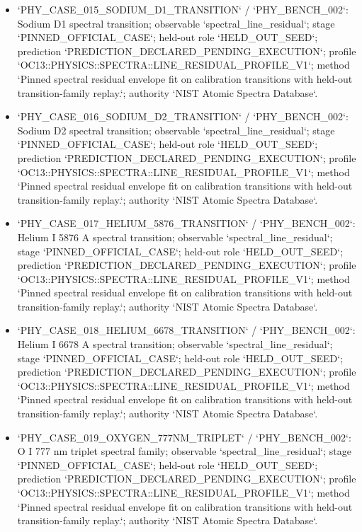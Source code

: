 \begin{itemize}
\item `PHY\_CASE\_015\_SODIUM\_D1\_TRANSITION` / `PHY\_BENCH\_002`: Sodium D1 spectral transition; observable `spectral\_line\_residual`; stage `PINNED\_OFFICIAL\_CASE`; held-out role `HELD\_OUT\_SEED`; prediction `PREDICTION\_DECLARED\_PENDING\_EXECUTION`; profile `OC13::PHYSICS::SPECTRA::LINE\_RESIDUAL\_PROFILE\_V1`; method `Pinned spectral residual envelope fit on calibration transitions with held-out transition-family replay.`; authority `NIST Atomic Spectra Database`.
\item `PHY\_CASE\_016\_SODIUM\_D2\_TRANSITION` / `PHY\_BENCH\_002`: Sodium D2 spectral transition; observable `spectral\_line\_residual`; stage `PINNED\_OFFICIAL\_CASE`; held-out role `HELD\_OUT\_SEED`; prediction `PREDICTION\_DECLARED\_PENDING\_EXECUTION`; profile `OC13::PHYSICS::SPECTRA::LINE\_RESIDUAL\_PROFILE\_V1`; method `Pinned spectral residual envelope fit on calibration transitions with held-out transition-family replay.`; authority `NIST Atomic Spectra Database`.
\item `PHY\_CASE\_017\_HELIUM\_5876\_TRANSITION` / `PHY\_BENCH\_002`: Helium I 5876 A spectral transition; observable `spectral\_line\_residual`; stage `PINNED\_OFFICIAL\_CASE`; held-out role `HELD\_OUT\_SEED`; prediction `PREDICTION\_DECLARED\_PENDING\_EXECUTION`; profile `OC13::PHYSICS::SPECTRA::LINE\_RESIDUAL\_PROFILE\_V1`; method `Pinned spectral residual envelope fit on calibration transitions with held-out transition-family replay.`; authority `NIST Atomic Spectra Database`.
\item `PHY\_CASE\_018\_HELIUM\_6678\_TRANSITION` / `PHY\_BENCH\_002`: Helium I 6678 A spectral transition; observable `spectral\_line\_residual`; stage `PINNED\_OFFICIAL\_CASE`; held-out role `HELD\_OUT\_SEED`; prediction `PREDICTION\_DECLARED\_PENDING\_EXECUTION`; profile `OC13::PHYSICS::SPECTRA::LINE\_RESIDUAL\_PROFILE\_V1`; method `Pinned spectral residual envelope fit on calibration transitions with held-out transition-family replay.`; authority `NIST Atomic Spectra Database`.
\item `PHY\_CASE\_019\_OXYGEN\_777NM\_TRIPLET` / `PHY\_BENCH\_002`: O I 777 nm triplet spectral family; observable `spectral\_line\_residual`; stage `PINNED\_OFFICIAL\_CASE`; held-out role `HELD\_OUT\_SEED`; prediction `PREDICTION\_DECLARED\_PENDING\_EXECUTION`; profile `OC13::PHYSICS::SPECTRA::LINE\_RESIDUAL\_PROFILE\_V1`; method `Pinned spectral residual envelope fit on calibration transitions with held-out transition-family replay.`; authority `NIST Atomic Spectra Database`.

\end{itemize}
